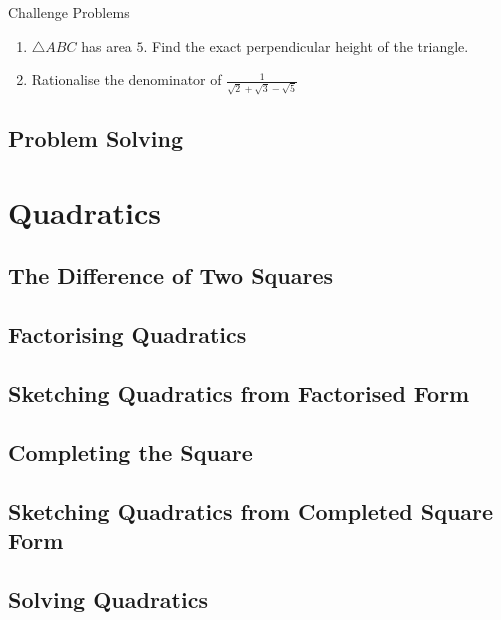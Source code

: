 \documentclass[../maths.tex]{subfiles}
\begin{document}
Challenge Problems 
\begin{enumerate}
    \item {}
    
    $\triangle ABC$ has area $5$. Find the exact perpendicular height of the triangle.

    \item Rationalise the denominator of $\frac{1}{\sqrt{2}+\sqrt{3}-\sqrt{5}}$
\end{enumerate}

\subsection*{Problem Solving}
\section{Quadratics}
\subsection*{The Difference of Two Squares}
\subsection*{Factorising Quadratics}
\subsection*{Sketching Quadratics from Factorised Form}
\subsection*{Completing the Square}
\subsection*{Sketching Quadratics from Completed Square Form}
\subsection*{Solving Quadratics}
\end{document}
